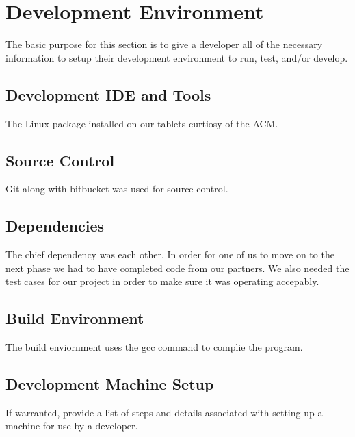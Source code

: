 \chapter{Development Environment}
The basic purpose for this section is to give a developer all of the necessary 
information to setup their development environment to run, test, and/or develop. 


\section{Development IDE and Tools}
The Linux package installed on our tablets curtiosy of the ACM.

\section{Source  Control}
Git along with bitbucket was used for source control.

\section{Dependencies}
The chief dependency was each other. In order for one of us to move on to the next phase we had to have completed code 
from our partners. We also needed the test cases for our project in order to make sure it was operating accepably.

\section{Build  Environment}
The build enviornment uses the gcc command to complie the program.

\section{Development Machine Setup}
If warranted, provide a list of steps and details associated with setting up a 
machine for use by a developer. 

